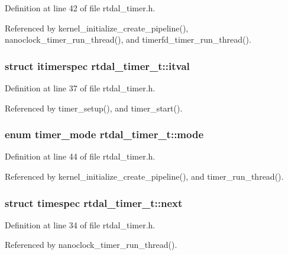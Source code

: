Definition at line 42 of file rtdal\-\_\-timer.\-h.



Referenced by kernel\-\_\-initialize\-\_\-create\-\_\-pipeline(), nanoclock\-\_\-timer\-\_\-run\-\_\-thread(), and timerfd\-\_\-timer\-\_\-run\-\_\-thread().

\subsubsection[{itval}]{\setlength{\rightskip}{0pt plus 5cm}struct itimerspec rtdal\-\_\-timer\-\_\-t\-::itval}\label{structrtdal__timer__t_ae5b29f6b10dd563261807b39bc1431c0}


Definition at line 37 of file rtdal\-\_\-timer.\-h.



Referenced by timer\-\_\-setup(), and timer\-\_\-start().

\subsubsection[{mode}]{\setlength{\rightskip}{0pt plus 5cm}enum {\bf timer\-\_\-mode} rtdal\-\_\-timer\-\_\-t\-::mode}\label{structrtdal__timer__t_a5c6e934cbc400f85f5022346a532d01b}


Definition at line 44 of file rtdal\-\_\-timer.\-h.



Referenced by kernel\-\_\-initialize\-\_\-create\-\_\-pipeline(), and timer\-\_\-run\-\_\-thread().

\subsubsection[{next}]{\setlength{\rightskip}{0pt plus 5cm}struct timespec rtdal\-\_\-timer\-\_\-t\-::next}\label{structrtdal__timer__t_a1224d0ece56f943b6afe4d7a5d8124a7}


Definition at line 34 of file rtdal\-\_\-timer.\-h.



Referenced by nanoclock\-\_\-timer\-\_\-run\-\_\-thread().

